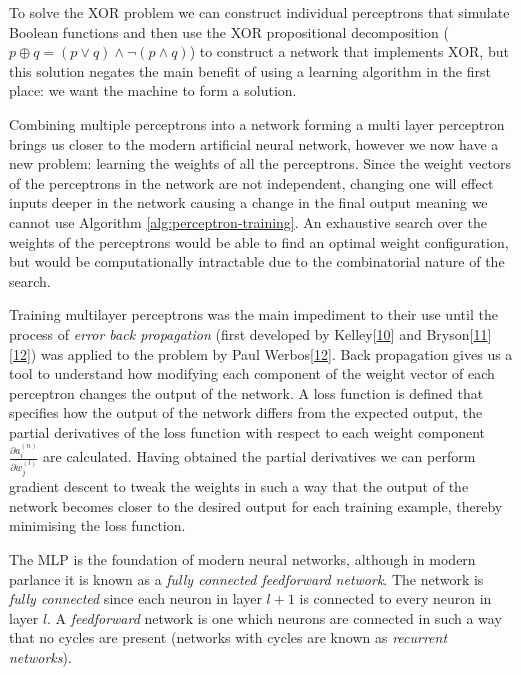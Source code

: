 \documentclass[A4paper,draft]{scrreprt}
\begin{document}
To solve the XOR problem we can construct individual perceptrons that
simulate Boolean functions and then use the XOR propositional
decomposition (\(p \oplus q = (p \lor q) \land \lnot (p \land q)\)) to
construct a network that implements XOR, but this solution negates the
main benefit of using a learning algorithm in the first place: we want
the machine to form a solution.

Combining multiple perceptrons into a network forming a multi layer
perceptron brings us closer to the modern artificial neural network,
however we now have a new problem: learning the weights of all the
perceptrons. Since the weight vectors of the perceptrons in the network
are not independent, changing one will effect inputs deeper in the
network causing a change in the final output meaning we cannot use
Algorithm \ref{alg:perceptron-training}. An exhaustive search over the
weights of the perceptrons would be able to find an optimal weight
configuration, but would be computationally intractable due to the
combinatorial nature of the search.

Training multilayer perceptrons was the main impediment to their use
until the process of \emph{error back propagation} (first developed by
Kelley{[}\protect\hyperlink{ref-kelley1960_GradientTheoryOptimal}{10}{]}
and
Bryson{[}\protect\hyperlink{ref-dreyfus1990_Artificialneuralnetworks}{11}{]}{[}\protect\hyperlink{ref-schmidhuber2015_DeepLearningNeural}{12}{]})
was applied to the problem by Paul
Werbos{[}\protect\hyperlink{ref-schmidhuber2015_DeepLearningNeural}{12}{]}.
Back propagation gives us a tool to understand how modifying each
component of the weight vector of each perceptron changes the output of
the network. A loss function is defined that specifies how the output of
the network differs from the expected output, the partial derivatives of
the loss function with respect to each weight component
\(\frac{\partial a^{(n)}_i}{\partial w^{(l)}_j}\) are calculated. Having
obtained the partial derivatives we can perform gradient descent to
tweak the weights in such a way that the output of the network becomes
closer to the desired output for each training example, thereby
minimising the loss function.

The MLP is the foundation of modern neural networks, although in modern
parlance it is known as a \emph{fully connected feedforward network}.
The network is \emph{fully connected} since each neuron in layer
\(l + 1\) is connected to every neuron in layer \(l\). A
\emph{feedforward} network is one which neurons are connected in such a
way that no cycles are present (networks with cycles are known as
\emph{recurrent networks}).
\end{document}
